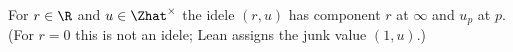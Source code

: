 For $r\in\R$ and $u\in\Zhat^\times$ the idele $(r,u)$ has component $r$ at $\infty$ and $u_p$ at $p$. (For $r=0$ this is not an idele; Lean assigns the junk value $(1,u)$.)

